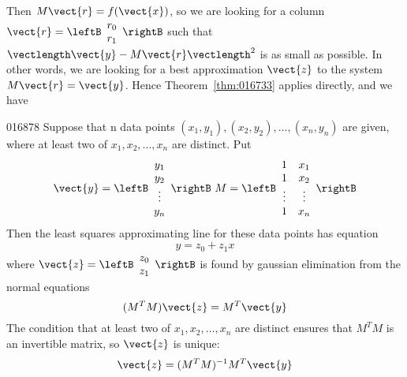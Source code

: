Then $M\vect{r} = f(\vect{x})$, so we are looking for a column $\vect{r} = 
\leftB \begin{array}{r}
r_0 \\
r_1
\end{array} \rightB$ such that $\vectlength\vect{y} - M\vect{r}\vectlength^{2}$ is as small as possible. In other words, we are looking for a best approximation $\vect{z}$ to the system $M\vect{r} = \vect{y}$. Hence Theorem~\ref{thm:016733} applies directly, and we have

\begin{theorem}{}{016878} %
Suppose that n data points $(x_{1}, y_{1}), (x_{2}, y_{2}), \dots, (x_{n}, y_{n})$ are given, where at least two of $x_{1}, x_{2}, \dots, x_{n}$ are distinct. Put
\begin{equation*}
\vect{y} = 
\leftB \begin{array}{c}
y_1 \\
y_2 \\
\vdots \\
y_n
\end{array} \rightB
\ M =
\leftB \begin{array}{cc}
1 & x_1 \\
1 & x_2 \\
\vdots & \vdots \\
1 & x_n
\end{array} \rightB
\end{equation*}
Then the least squares approximating line for these data points has equation
\begin{equation*}
y = z_0 +z_1x
\end{equation*}
where
$ \vect{z} = 
\leftB \begin{array}{r}
z_0 \\
z_1
\end{array} \rightB$ is found by gaussian elimination from the normal equations
\begin{equation*}
(M^TM)\vect{z} = M^T\vect{y}
\end{equation*}
The condition that at least two of $x_{1}, x_{2}, \dots, x_{n}$  are distinct ensures that $M^{T}M$ is an invertible matrix, so $\vect{z}$ is unique:
\begin{equation*}
\vect{z} = (M^TM)^{-1}M^T\vect{y}
\end{equation*}
\end{theorem}


